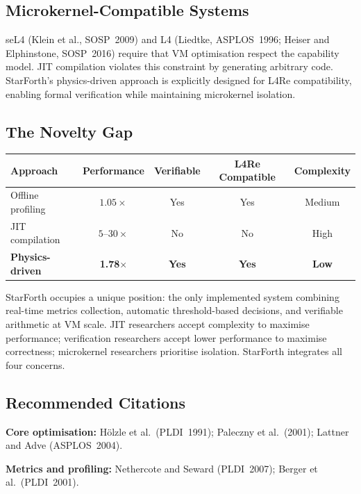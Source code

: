 \subsection{Microkernel-Compatible Systems}

seL4 (Klein et al., SOSP~2009) and L4 (Liedtke, ASPLOS~1996; Heiser and
Elphinstone, SOSP~2016) require that VM optimisation respect the capability
model. JIT compilation violates this constraint by generating arbitrary code.
StarForth's physics-driven approach is explicitly designed for L4Re
compatibility, enabling formal verification while maintaining microkernel
isolation.

\subsection{The Novelty Gap}

\begin{center}
\begin{tabular}{lcccc}
\toprule
Approach & Performance & Verifiable & L4Re Compatible & Complexity \\
\midrule
Offline profiling  & $1.05\times$ & Yes & Yes & Medium \\
JIT compilation    & $5\text{--}30\times$ & No  & No  & High \\
\textbf{Physics-driven} & \textbf{1.78$\times$} & \textbf{Yes} & \textbf{Yes} & \textbf{Low} \\
\bottomrule
\end{tabular}
\end{center}

StarForth occupies a unique position: the only implemented system combining
real-time metrics collection, automatic threshold-based decisions, and
verifiable arithmetic at VM scale. JIT researchers accept complexity to
maximise performance; verification researchers accept lower performance to
maximise correctness; microkernel researchers prioritise isolation.
StarForth integrates all four concerns.

\subsection{Recommended Citations}

\textbf{Core optimisation:} Hölzle et al.\ (PLDI~1991); Paleczny et al.\
(2001); Lattner and Adve (ASPLOS~2004).

\textbf{Metrics and profiling:} Nethercote and Seward (PLDI~2007); Berger
et al.\ (PLDI~2001).

